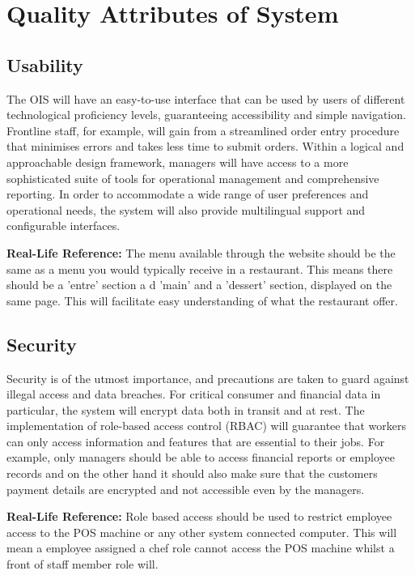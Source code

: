 \documentclass{article}
\begin{document}
\clearpage
\section{Quality Attributes of System}

\subsection{Usability} 
The OIS will have an easy-to-use interface that can be used by users of different technological proficiency levels, guaranteeing accessibility and simple navigation. Frontline staff, for example, will gain from a streamlined order entry procedure that minimises errors and takes less time to submit orders. Within a logical and approachable design framework, managers will have access to a more sophisticated suite of tools for operational management and comprehensive reporting. In order to accommodate a wide range of user preferences and operational needs, the system will also provide multilingual support and configurable interfaces.



\textbf{Real-Life Reference: } The menu available through the website should be the same as a menu you would typically receive in a restaurant. This means there should be a 'entre' section a d 'main' and a 'dessert' section, displayed on the same page. This will facilitate easy understanding of what the restaurant offer.

\subsection{Security}
Security is of the utmost importance, and precautions are taken to guard against illegal access and data breaches. For critical consumer and financial data in particular, the system will encrypt data both in transit and at rest. The implementation of role-based access control (RBAC) will guarantee that workers can only access information and features that are essential to their jobs. For example, only managers should be able to access financial reports or employee records and on the other hand it should also make sure that the customers payment details are encrypted and not accessible even by the managers.


\textbf{Real-Life Reference: } Role based access should be used to restrict employee access to the POS machine or any other system connected computer. This will mean a employee assigned a chef role cannot access the POS machine whilst a front of staff member role will.
\end{document}
